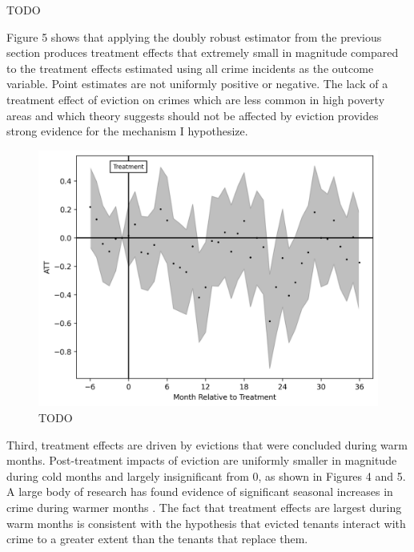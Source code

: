 \documentclass[12pt]{article}
\begin{document}
\begin{landscape}
    
    \begin{table}[H]
        \centering
        
        \caption{TODO}
        \label{tab:my_label}
    \end{table}
    \end{landscape}


    Figure 5 shows that applying the doubly robust estimator from the previous section produces treatment effects that extremely small in magnitude compared to the treatment effects estimated using all crime incidents as the outcome variable. Point estimates are not uniformly positive or negative. The lack of a treatment effect of eviction on crimes which are less common in high poverty areas and which theory suggests should not be affected by eviction provides strong evidence for the mechanism I hypothesize. 

    \begin{figure}
        \centering
        \includegraphics{output/group_1_crimes_500m/figures/att_gt_dr_event_study_long_horizon.png}
        \caption{TODO}
        \label{fig:my_label}
    \end{figure}
    
    


    Third, treatment effects are driven by evictions that were concluded during warm months. Post-treatment impacts of eviction are uniformly smaller in magnitude during cold months and largely insignificant from 0, as shown in Figures 4 and 5. A large body of research has found evidence of significant seasonal increases in crime during warmer months \citep{lauritsen_seasonal_2014}. The fact that treatment effects are largest during warm months is consistent with the hypothesis that evicted tenants interact with crime to a greater extent than the tenants that replace them. 
\end{document}
